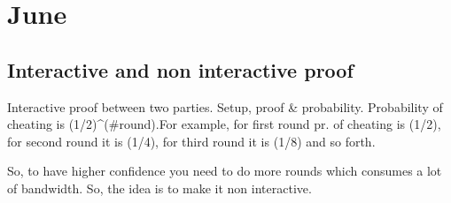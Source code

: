 \chapter{June}

	\section{Interactive and non interactive proof}

	Interactive proof between two parties. 
	Setup, proof & probability. Probability of cheating is (1/2)^(#round).For example, for first round pr. of cheating is (1/2), for second round it is (1/4), for third round it is (1/8) and so forth.

	So, to have higher confidence you need to do more rounds which consumes a lot of bandwidth. So, the idea is to make it non interactive. 

	
